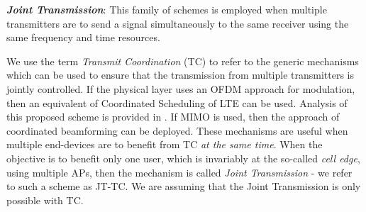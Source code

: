 \noindent\textit{\textbf{Joint Transmission}}: This family of schemes is employed when multiple transmitters are to send a signal simultaneously to the same receiver using the same frequency and time resources.


We use the term \emph{Transmit Coordination} (TC) to refer to the generic mechanisms which can be used to ensure that the transmission from multiple transmitters is jointly controlled. If the physical layer uses an OFDM approach for modulation, then an equivalent of Coordinated Scheduling of LTE can be used. Analysis of this proposed scheme is provided in \cite{Coordinated_OFDMA}. If MIMO is used, then the approach of coordinated beamforming can be deployed. These mechanisms are useful when multiple end-devices are to benefit from TC \emph{at the same time}. When the objective is to benefit only one user, which is invariably at the so-called \emph{cell edge}, using multiple APs, then the mechanism is called \emph{Joint Transmission} - we refer to such a scheme as JT-TC. We are assuming that the Joint Transmission is only possible with TC.

